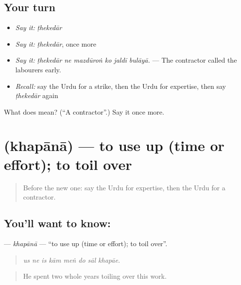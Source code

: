 \subsection*{Your turn}
\begin{itemize}
\raggedright
  \item \emph{Say it:} \emph{ṭhekedār}
  \item \emph{Say it:} \emph{ṭhekedār}, once more
  \item \emph{Say it:} \emph{ṭhekedār ne mazdūroṅ ko jaldī bulāyā.} — The contractor called the labourers early.
  \item \emph{Recall:} say the Urdu for a strike, then the Urdu for expertise, then say \emph{ṭhekedār} again
\end{itemize}

\begin{tcolorbox}[breakable,colback=teal!4,colframe=teal!35!black,title={Before you move on}]
What does  mean? (\textquotedblleft{}A contractor\textquotedblright{}.) Say it once more.
\end{tcolorbox}
\section[\texorpdfstring{\ur{کھپانا} (khapānā)}{کھپانا (khapānā)}]{ (khapānā) — to use up (time or effort); to toil over}

\label{lesson:UR-C495-khapana}



\begin{quote}
Before the new one: say the Urdu for expertise, then the Urdu for a contractor.
\end{quote}

\subsection*{You'll want to know: }
\textbf{} — \emph{khapānā} — \textquotedblleft{}to use up (time or effort); to toil over\textquotedblright{}.

\begin{quote}
       
\end{quote}

\begin{quote}
\emph{us ne is kām meṅ do sāl khapāe.}
\end{quote}

\begin{quote}
He spent two whole years toiling over this work.
\end{quote}

